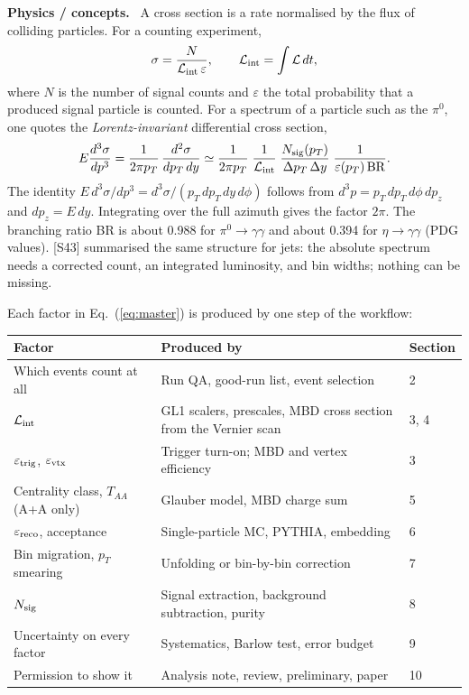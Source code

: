 \documentclass[11pt,letterpaper]{article}
\newcommand{\hd}[1]{\par\smallskip\noindent\textbf{\color{blue!50!black}#1.}\ }
\begin{document}
\hd{Physics / concepts} A cross section is a rate normalised by the flux of colliding particles. For a counting experiment,
\begin{equation}
\sigma = \frac{N}{\mathcal{L}_{\rm int}\,\varepsilon}, \qquad \mathcal{L}_{\rm int} = \int \mathcal{L}\,dt ,
\end{equation}
where $N$ is the number of signal counts and $\varepsilon$ the total probability that a produced signal particle is counted.
For a spectrum of a particle such as the $\pi^0$, one quotes the \emph{Lorentz-invariant} differential cross section,
\begin{equation}
E\frac{d^3\sigma}{dp^3} = \frac{1}{2\pi p_T}\,\frac{d^2\sigma}{dp_T\,dy}
\simeq \frac{1}{2\pi p_T}\;\frac{1}{\mathcal{L}_{\rm int}}\;\frac{N_{\rm sig}(p_T)}{\Delta p_T\,\Delta y}\;
\frac{1}{\varepsilon(p_T)\,\mathrm{BR}} .
\label{eq:master}
\end{equation}
The identity $E\,d^3\sigma/dp^3 = d^3\sigma/(p_T\,dp_T\,dy\,d\phi)$ follows from $d^3p = p_T\,dp_T\,d\phi\,dp_z$ and $dp_z = E\,dy$.
Integrating over the full azimuth gives the factor $2\pi$. The branching ratio BR is about 0.988 for $\pi^0\to\gamma\gamma$ and about
0.394 for $\eta\to\gamma\gamma$ (PDG values). [S43] summarised the same structure for jets: the absolute spectrum needs a corrected
count, an integrated luminosity, and bin widths; nothing can be missing.

Each factor in Eq.~(\ref{eq:master}) is produced by one step of the workflow:
\begin{center}\small
\begin{tabularx}{\linewidth}{@{}lX l@{}}\toprule
Factor & Produced by & Section\\\midrule
Which events count at all & Run QA, good-run list, event selection & 2\\
$\mathcal{L}_{\rm int}$ & GL1 scalers, prescales, MBD cross section from the Vernier scan & 3, 4\\
$\varepsilon_{\rm trig}$, $\varepsilon_{\rm vtx}$ & Trigger turn-on; MBD and vertex efficiency & 3\\
Centrality class, $T_{AA}$ (A+A only) & Glauber model, MBD charge sum & 5\\
$\varepsilon_{\rm reco}$, acceptance & Single-particle MC, PYTHIA, embedding & 6\\
Bin migration, $p_T$ smearing & Unfolding or bin-by-bin correction & 7\\
$N_{\rm sig}$ & Signal extraction, background subtraction, purity & 8\\
Uncertainty on every factor & Systematics, Barlow test, error budget & 9\\
Permission to show it & Analysis note, review, preliminary, paper & 10\\\bottomrule
\end{tabularx}
\end{center}
\end{document}
